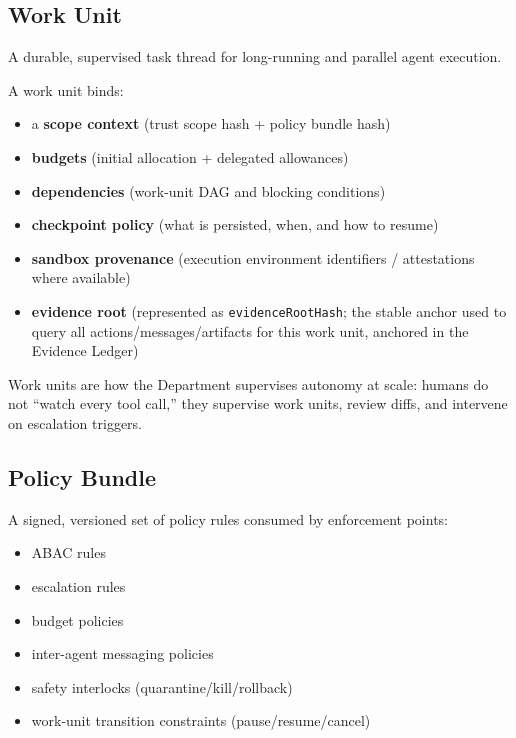 \documentclass[11pt]{article}
\begin{document}
\hypertarget{work-unit}{%
\subsection{Work Unit}\label{work-unit}}

A durable, supervised task thread for long-running and parallel agent
execution.

A work unit binds:

\begin{itemize}
\tightlist
\item
  a \textbf{scope context} (trust scope hash + policy bundle hash)
\item
  \textbf{budgets} (initial allocation + delegated allowances)
\item
  \textbf{dependencies} (work-unit DAG and blocking conditions)
\item
  \textbf{checkpoint policy} (what is persisted, when, and how to
  resume)
\item
  \textbf{sandbox provenance} (execution environment identifiers /
  attestations where available)
\item
  \textbf{evidence root} (represented as \texttt{evidenceRootHash}; the
  stable anchor used to query all actions/messages/artifacts for this
  work unit, anchored in the Evidence Ledger)
\end{itemize}

Work units are how the Department supervises autonomy at scale: humans
do not ``watch every tool call,'' they supervise work units, review
diffs, and intervene on escalation triggers.

\hypertarget{policy-bundle}{%
\subsection{Policy Bundle}\label{policy-bundle}}

A signed, versioned set of policy rules consumed by enforcement points:

\begin{itemize}
\tightlist
\item
  ABAC rules
\item
  escalation rules
\item
  budget policies
\item
  inter-agent messaging policies
\item
  safety interlocks (quarantine/kill/rollback)
\item
  work-unit transition constraints (pause/resume/cancel)
\end{itemize}
\end{document}
